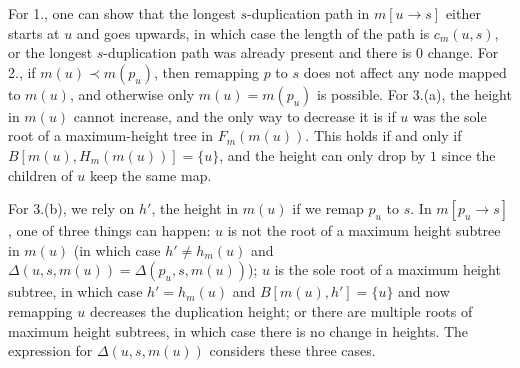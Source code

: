 \documentclass[10pt]{article}
\begin{document}
\begin{proofsketch}
For 1., one can show that the longest $s$-duplication path in $m[u \rightarrow s]$ either starts at $u$ and goes upwards, in which case the length of the path is $c_m(u, s)$, or the longest $s$-duplication path was already present and there is $0$ change.  
For 2., if $m(u) \prec m(p_u)$, then remapping $p$ to $s$ does not affect any node mapped to $m(u)$, and otherwise only $m(u) = m(p_u)$ is possible.  
For 3.(a), the height in $m(u)$ cannot increase, and the only way to decrease it is if $u$ was the sole root of a maximum-height tree in $F_m(m(u))$.
This holds if and only if $B[m(u), H_m(m(u))] = \{u\}$, and the height can only drop by $1$ since the children of $u$ keep the same map.

For 3.(b), we rely on $h'$, the height in $m(u)$ if we remap $p_u$ to $s$.  In $m[p_u \rightarrow s]$, one of three things can happen: $u$ is not the root of a maximum height subtree in $m(u)$ (in which case $h' \neq h_m(u)$ and $\Delta(u, s, m(u)) = \Delta(p_u, s, m(u))$); $u$ is the sole root of a maximum height subtree, in which case $h' = h_m(u)$ and $B[m(u), h'] = \{u\}$ and now remapping $u$ decreases the duplication height; or there are multiple roots of maximum height subtrees, in which case there is no change in heights.  The expression for $\Delta(u, s, m(u))$ considers these three cases.
\end{proofsketch}
\end{document}
